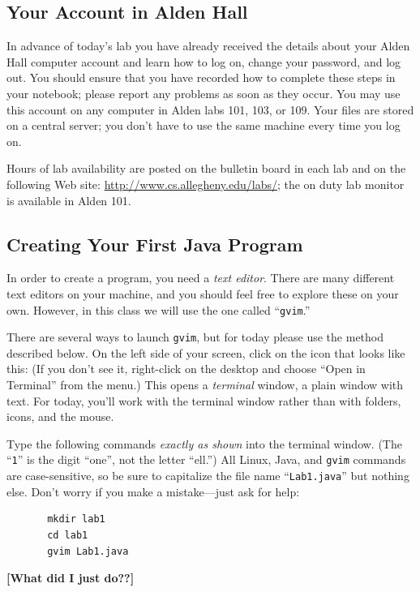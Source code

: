 \subsection*{Your Account in Alden Hall}

In advance of today's lab you have already received the details about your Alden Hall computer account and learn how to
log on, change your password, and log out.  You should ensure that you have recorded how to complete these steps in your
notebook; please report any problems as soon as they occur. You may use this account on any computer in Alden labs 101,
103, or 109. Your files are stored on a central server; you don't have to use the same machine every time you log on.

Hours of lab availability are posted on the bulletin board in each lab and on the following Web site:
\url{http://www.cs.allegheny.edu/labs/}; the on duty lab monitor is available in Alden 101.

\subsection*{Creating Your First Java Program}
In order to create a program, you need a {\em text editor}. There are
many different text editors on your machine, and  you should feel free
to explore these on your own. However, in this class we will use the one  called ``{\tt gvim}.''

There are several ways to launch {\tt gvim}, but for today please use the
method described below.
On the left side of your screen, click on the icon that looks like this:
(If you don't see it, right-click on the desktop and choose ``Open in
  Terminal'' from the menu.)  This opens a
{\em terminal} window, a plain window with text. For today, you'll work
with the terminal window rather than with folders, icons, and the mouse.

Type the following commands {\em exactly as shown} into the terminal window. 
(The ``{\tt 1}'' is the digit ``one'', not the letter ``ell.'') All Linux, Java, 
and {\tt gvim}
commands are case-sensitive, so be sure to capitalize the file name 
``{\tt Lab1.java}'' but nothing else.
Don't worry if you make a mistake---just ask for help:
\begin{verbatim}
       mkdir lab1
       cd lab1
       gvim Lab1.java
       \end{verbatim}
       {\color{red}\bf [What did I just do??]}

